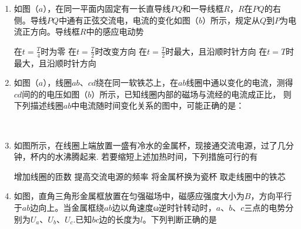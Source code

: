 \begin{enumerate}
\item 
{}
如图（$ a $），在同一平面内固定有一长直导线$ PQ $和一导线框$ R $，$ R $在$ PQ $的右侧。导线$ PQ $中通有正弦交流电，电流的变化如图（$ b $）所示，规定从$ Q $到$ P $为电流正方向。导线框$ R $中的感应电动势  
\begin{figure}[h!]
\centering

\end{figure}


\fourchoices
{在$t = \frac { T } { 4 }$时为零}
{在$t = \frac { T } { 2 }$时改变方向}
{在$t = \frac { T } { 2 }$时最大，且沿顺时针方向}
{在$ t=T $时最大，且沿顺时针方向}


\item 
{}
如图（$ a $），线圈$ ab $、$ cd $绕在同一软铁芯上，在$ ab $线圈中通以变化的电流，测得$ cd $间的的电压如图（$ b $）所示，已知线圈内部的磁场与流经的电流成正比， 则下列描述线圈$ ab $中电流随时间变化关系的图中，可能正确的是：  
\begin{figure}[h!]
\centering
\\

\end{figure}








\item 
{}
如图所示，在线圈上端放置一盛有冷水的金属杯，现接通交流电源，过了几分钟，杯内的水沸腾起来. 若要缩短上述加热时间，下列措施可行的有  
\begin{figure}[h!]
\centering

\end{figure}


\fourchoices
{增加线圈的匝数}
{提高交流电源的频率}
{将金属杯换为瓷杯}
{取走线圈中的铁芯}






\item 
{}
如图，直角三角形金属框放置在匀强磁场中，磁感应强度大小为$ B $，方向平行于$ ab $边向上。当金属框绕$ ab $边以角速度ω逆时针转动时，$ a $、$ b $、$ c $三点的电势分别为$ U_a $、$ U_b $、$ U_c $.已知$ bc $边的长度为$ l $。下列判断正确的是  



\end{enumerate}
